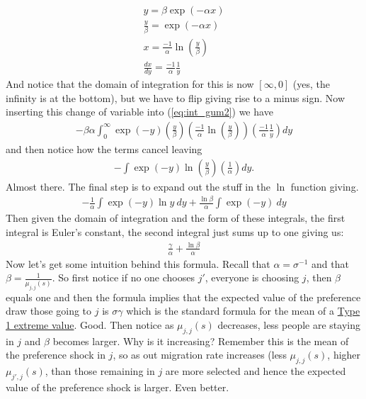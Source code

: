 \documentclass[pdftex,11pt]{article}
\begin{document}
\begin{enumerate}
\begin{align}
y = \beta \exp(-\alpha x)\\
\frac{y}{\beta} = \exp(-\alpha x) \\
x = \frac{-1}{\alpha}\ln \left(\frac{y}{\beta}\right)\\
\frac{dx}{dy} = \frac{-1}{\alpha}\frac{1}{y}
\label{eq:change_var}
\end{align}
And notice that the domain of integration for this is now $[\infty, 0]$ (yes, the infinity is at the bottom), but we have to flip giving rise to a minus sign. Now inserting this change of variable into (\ref{eq:int_gum2}) we have
\begin{align}
-\beta \alpha \int_{0}^{\infty} \exp(-y)\left(\frac{y}{\beta}\right)\left(\frac{-1}{\alpha}\ln \left(\frac{y}{\beta}\right)\right)\left(\frac{-1}{\alpha}\frac{1}{y}\right)dy
\end{align}
and then notice how the terms cancel leaving
\begin{align}
-\int \exp(-y)\ln \left(\frac{y}{\beta}\right)\left(\frac{1}{\alpha}\right)dy.
\end{align}
Almost there. The final step is to expand out the stuff in the $\ln$ function giving.
\begin{align}
-\frac{1}{\alpha} \int \exp(-y)\ln y \ dy  +  \frac{\ln \beta}{\alpha} \int \exp(-y) \ dy
\end{align}
Then given the domain of integration and the form of these integrals, the first integral is Euler's constant, the second integral just sums up to one giving us:
\begin{align}
\frac{\gamma}{\alpha} + \frac{\ln \beta}{\alpha}
\end{align}
Now let's get some intuition behind this formula. Recall that $\alpha = \sigma^{-1}$ and that $\beta = \frac{1}{\mu_{j,j}(s)}$. So first notice if no one chooses $j'$, everyone is choosing $j$, then $\beta$ equals one and then the formula implies that the expected value of the preference draw those going to $j$ is $\sigma \gamma$ which is the standard formula for the mean of a \href{https://en.wikipedia.org/wiki/Gumbel_distribution}{Type 1 extreme value}. Good. Then notice as $\mu_{j,j}(s)$ decreases, less people are staying in $j$ and $\beta$ becomes larger. Why is it increasing? Remember this is the mean of the preference shock in $j$, so as out migration rate increases (less $\mu_{j,j}(s)$, higher $\mu_{j',j}(s)$, than those remaining in $j$ are more selected and hence the expected value of the preference shock is larger. Even better.

\end{enumerate}
\end{document}
